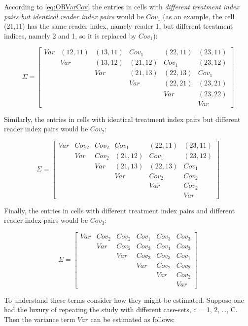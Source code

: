\documentclass[
]{book}
\begin{document}
According to \eqref{eq:ORVarCov} the entries in cells with \emph{different treatment index pairs but identical reader index pairs} would be \(Cov_1\) (as an example, the cell (21,11) has the same reader index, namely reader 1, but different treatment indices, namely 2 and 1, so it is replaced by \(Cov_1\)):

\[
\Sigma=
\begin{bmatrix}
Var & (12,11) & (13,11) & Cov_1 & (22,11) & (23,11) \\
& Var & (13,12) & (21,12) & Cov_1 & (23,12) \\ 
& & Var & (21,13) & (22,13) & Cov_1 \\ 
& & & Var & (22,21) & (23,21) \\
& & & & Var & (23,22) \\ 
& & & & & Var
\end{bmatrix}
\]

Similarly, the entries in cells with identical treatment index pairs but different reader index pairs would be \(Cov_2\):

\[
\Sigma=
\begin{bmatrix}
Var & Cov_2 & Cov_2 & Cov_1 & (22,11) & (23,11) \\
& Var & Cov_2 & (21,12) & Cov_1 & (23,12) \\ 
&  & Var & (21,13) & (22,13) & Cov_1 \\ 
&  &  & Var & Cov_2 & Cov_2 \\
&  &  &  & Var & Cov_2 \\ 
&  &  &  &  & Var
\end{bmatrix}
\]

Finally, the entries in cells with different treatment index pairs and different reader index pairs would be \(Cov_3\):

\[
\Sigma=
\begin{bmatrix}
Var & Cov_2 & Cov_2 & Cov_1 & Cov_3 & Cov_3 \\
& Var & Cov_2 & Cov_3 & Cov_1 & Cov_3 \\ 
&  & Var & Cov_3 & Cov_3 & Cov_1 \\ 
&  &  & Var & Cov_2 & Cov_2 \\
&  &  &  & Var & Cov_2 \\ 
&  &  &  &  & Var
\end{bmatrix}
\]

To understand these terms consider how they might be estimated. Suppose one had the luxury of repeating the study with different case-sets, c = 1, 2, \ldots, C. Then the variance term \(Var\) can be estimated as follows:
\end{document}
